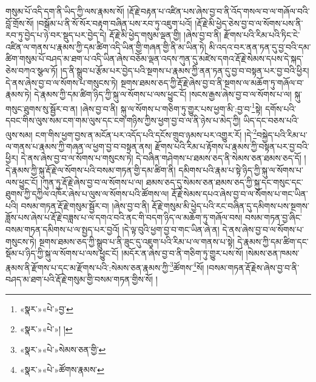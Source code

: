 གསུམ་པོ་འདི་དག་ནི་ཡིད་ཀྱི་ལས་རྣམས་སོ། །རྡོ་རྗེ་བརྟན་པ་འཛིན་པས་ཞེས་བྱ་བ་ནི་འོད་གསལ་བ་ལ་གཞོལ་བའི་བློ་གྲོས་སོ། །བསྒོམ་པ་ནི་སོ་སོར་བརྟག་བཞིན་པས་རབ་ཏུ་འཇུག་པའོ། །རྡོ་རྗེ་མི་ཕྱེད་ཅེས་བྱ་བ་ལ་སོགས་པས་ནི་རབ་ཏུ་བྱེད་པ་ཉེ་བར་སྡུད་པར་བྱེད་དེ། རྡོ་རྗེ་མི་ཕྱེད་གསུམ་ལྡན་གྱི། །ཞེས་བྱ་བ་ནི། རྫོགས་པའི་རིམ་པའི་ཏིང་ངེ་འཛིན་ལ་གནས་པ་རྣམས་ཀྱི་དམ་ཚིག་འདི་ཡིན་གྱི་གཞན་གྱི་ནི་མ་ཡིན་ཏེ། མི་འདའ་བར་ནན་ཏན་དུ་བྱ་བའི་དམ་ཚིག་གསུམ་པོ་བཤད་མ་ཐག་པ་འདི་ཡིན་ཞེས་བཅོམ་ལྡན་འདས་ཀུན་དུ་མཛེས་དགའ་རྡོ་རྗེ་སེམས་དཔས་དེ་སྐད་ཅེས་བཀའ་སྩལ་ཏོ། །ད་ནི་སྒྲུབ་པ་རྩོམ་པར་བྱེད་པའི་སྔགས་པ་རྣམས་ཀྱི་ནན་ཏན་དུ་བྱ་བ་བསྟན་པར་བྱ་བའི་ཕྱིར། དེ་ནས་ཞེས་བྱ་བ་ལ་སོགས་པ་གསུངས་ཏེ། སྔགས་ཐམས་ཅད་ཀྱི་རྡོ་རྗེ་ཞེས་བྱ་བ་ནི་སྔགས་ལ་མཆོག་ཏུ་གཞོལ་བ་རྣམས་ཏེ། དེ་རྣམས་ཀྱི་དམ་ཚིག་ཉིད་ཀྱི་སྐུ་ལ་སོགས་པ་ལས་ཕྱུང་ངོ། །སངས་རྒྱས་ཞེས་བྱ་བ་ལ་སོགས་པ་ལ། སྐུ་གསུང་ཐུགས་སུ་སྦྱོར་བ་ན། །ཞེས་བྱ་བ་ནི། སྐུ་ལ་སོགས་པ་གཅིག་ཏུ་གྱུར་པས་ཕྱག་མི་:བྱ་བ་\footnote{«སྣར་»«པེ་»བྱ་}སྟེ། དགོས་པའི་དབང་གིས་ལུས་སམ་ངག་གམ་ལུས་དང་ངག་གཉིས་ཀྱིས་ཕྱག་བྱ་བ་ལ་ནི་ཉེས་པ་མེད་ཀྱི། ཡིད་དང་བཅས་པའི་ལུས་སམ། ངག་གིས་ཕྱག་བྱས་ན་མངོན་པར་འདོད་པའི་དངོས་གྲུབ་ཉམས་པར་འགྱུར་རོ། །དེ་\footnote{«སྣར་»«པེ་»། །}བསྐྱེད་པའི་རིམ་པ་ལ་གནས་པ་རྣམས་ཀྱི་གཞན་ལ་ཕྱག་བྱ་བ་བསྟན་ནས། རྫོགས་པའི་རིམ་པ་རྟོགས་པ་རྣམས་ཀྱི་བསྟན་པར་བྱ་བའི་ཕྱིར། དེ་ནས་ཞེས་བྱ་བ་ལ་སོགས་པ་གསུངས་ཏེ། དེ་བཞིན་གཤེགས་པ་ཐམས་ཅད་ནི་སེམས་ཅན་ཐམས་ཅད་དོ། །དེ་རྣམས་ཀྱི་སྐུ་རྡོ་རྗེ་ལ་སོགས་པའི་བསམ་གཏན་གྱི་དམ་ཚིག་ནི། དམིགས་པའི་རྣམ་པ་སྟེ་ཉིད་ཀྱི་སྐུ་ལ་སོགས་པ་ལས་ཕྱུང་ངོ། །ཀུན་ཏུ་རྡོ་རྗེ་ཞེས་བྱ་བ་ལ་སོགས་པ་ལ། ཐམས་ཅད་དུ་སེམས་ཅན་ཐམས་ཅད་ཀྱི་སྐུ་དང་གསུང་དང་ཐུགས་ཀྱི་དཀྱིལ་འཁོར་ཞེས་པ་ལུས་ལ་སོགས་པའི་ཚོགས་ལ། རྡོ་རྗེ་སེམས་དཔའ་ཞེས་བྱ་བ་ལ་སོགས་པ་གང་ཡིན་པའི། བསམ་གཏན་རྡོ་རྗེ་གསུམ་སྦྱོར་བ། །ཞེས་བྱ་བ་ནི། རྡོ་རྗེ་གསུམ་མི་ཕྱེད་པའི་རང་བཞིན་དུ་དམིགས་པས་སྔགས་ཟློས་པས་ཞེས་པ་རྡོ་རྗེ་བཟླས་པ་ལ་དགའ་བའི་ནང་གི་བདག་ཉིད་ལ་མཆོག་ཏུ་གཞོལ་བས། བསམ་གཏན་བྱ་ཞིང་བསམ་གཏན་དམིགས་པ་ལ་སྤྱད་པར་བྱའོ། །དེ་ལྟ་བུའི་ཕྱག་བྱ་བ་གང་ཡིན་ཞེ་ན། དེ་ནས་ཞེས་བྱ་བ་ལ་སོགས་པ་གསུངས་ཏེ། སྔགས་ཐམས་ཅད་ཀྱི་སྒྲུབ་པ་ནི་ཟུང་དུ་འཇུག་པའི་རིམ་པ་ལ་གནས་པ་སྟེ། དེ་རྣམས་ཀྱི་དམ་ཚིག་དང་སྡོམ་པ་ཉིད་ཀྱི་སྐུ་ལ་སོགས་པ་ལས་ཕྱུང་ངོ། །མདོར་ན་ཞེས་བྱ་བ་ནི་གཅིག་ཏུ་གྱུར་པས་སོ། །སེམས་ཅན་ཁམས་རྣམས་ནི་རྫོགས་པ་དང་མ་རྫོགས་པའི་:སེམས་ཅན་རྣམས་ཀྱི་\footnote{«སྣར་»«པེ་»སེམས་ཅན་གྱི་}ཚོགས་\footnote{«སྣར་»«པེ་»ཚོགས་རྣམས་}སོ། །བསམ་གཏན་རྡོ་རྗེས་ཞེས་བྱ་བ་ནི་བཤད་མ་ཐག་པའི་རྡོ་རྗེ་གསུམ་གྱི་བསམ་གཏན་གྱིས་སོ། །
